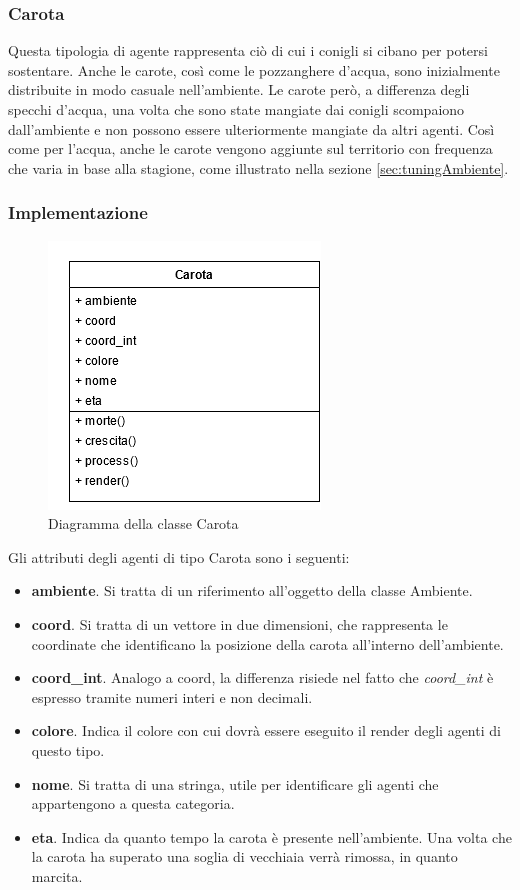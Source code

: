 \documentclass[11pt]{article}
\begin{document}
\subsubsection{Carota}
Questa tipologia di agente rappresenta ciò di cui i conigli si cibano per potersi sostentare. Anche le carote, così come le pozzanghere d'acqua, sono inizialmente distribuite in modo casuale nell'ambiente. Le carote però, a differenza degli specchi d'acqua, una volta che sono state mangiate dai conigli scompaiono dall'ambiente e non possono essere ulteriormente mangiate da altri agenti. Così come per l'acqua, anche le carote vengono aggiunte sul territorio con frequenza che varia in base alla stagione, come illustrato nella sezione \ref{sec:tuningAmbiente}. 

\subsubsection{Implementazione}

\begin{figure}[h!]
     \centering
     \includegraphics[scale = 0.7]{Carota.png}
     \caption{Diagramma della classe Carota}
     \label{fig:carotaUML}
\end{figure}
 Gli attributi degli agenti di tipo Carota sono i seguenti: 
\begin{itemize}
    \item \textbf{ambiente}. Si tratta di un riferimento all'oggetto della classe Ambiente. 
    \item \textbf{coord}. Si tratta di un vettore in due dimensioni, che rappresenta le coordinate che identificano la posizione della carota all'interno dell'ambiente. 
    \item \textbf{coord\_int}. Analogo a coord, la differenza risiede nel fatto che \emph{coord\_int} è espresso tramite numeri interi e non decimali. 
    \item \textbf{colore}. Indica il colore con cui dovrà essere eseguito il render degli agenti di questo tipo.
    \item \textbf{nome}. Si tratta di una stringa, utile per identificare gli agenti che appartengono a questa categoria. 
    \item \textbf{eta}. Indica da quanto tempo la carota è presente nell'ambiente. Una volta che la carota ha superato una soglia di vecchiaia verrà rimossa, in quanto marcita. 
\end{itemize}
\end{document}
